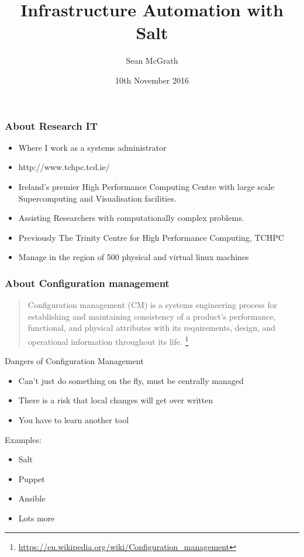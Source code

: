 \documentclass{beamer}
\title[]{Infrastructure Automation with Salt}
\author{Sean McGrath}
\institute[TCD]
{
Resarch IT \\
Trinity College Dublin \\
\medskip
\textit{sean.mcgrath@tcd.ie} 
}
\date{10th November 2016}
\begin{document}
\begin{frame}
\titlepage
\end{frame}





\begin{frame}
\frametitle{About Research IT}

\begin{itemize}
\item Where I work as a systems administrator
\item http://www.tchpc.tcd.ie/
\item Ireland's premier High Performance Computing Centre with large scale Supercomputing and Visualisation facilities.
\item Assisting Researchers with computationally complex problems.
\item Previously The Trinity Centre for High Performance Computing, TCHPC
\item Manage in the region of 500 physical and virtual linux machines
\end{itemize}

\end{frame}

\begin{frame}
\frametitle{About Configuration management}
\begin{quote}
Configuration management (CM) is a systems engineering process for establishing and maintaining consistency of a product's performance, functional, and physical attributes with its requirements, design, and operational information throughout its life.
\footnote{\url{https://en.wikipedia.org/wiki/Configuration_management}} %
\end{quote}
Dangers of Configuration Management
\begin{itemize}
\item Can't just do something on the fly, must be centrally managed
\item There is a risk that local changes will get over written
\item You have to learn another tool
\end{itemize}
Examples:
\begin{itemize}
\item Salt
\item Puppet
\item Ansible
\item Lots more
\end{itemize}

\end{frame}
\end{document}
